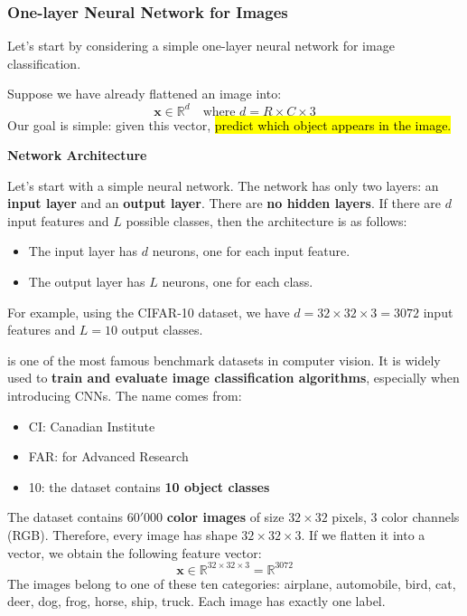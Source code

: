 \subsubsection{One-layer Neural Network for Images}\label{sec:one-layer-neural-network-for-images}

Let's start by considering a simple one-layer neural network for image classification.

\highspace
Suppose we have already flattened an image into:
\begin{equation*}
    \mathbf{x} \in \mathbb{R}^{d} \quad \text{where } d = R \times C \times 3
\end{equation*}
Our goal is simple: given this vector, \hl{predict which object appears in the image.}

\highspace
\begin{flushleft}
    \textcolor{Green3}{ \textbf{Network Architecture}}
\end{flushleft}
Let's start with a simple neural network. The network has only two layers: an \textbf{input layer} and an \textbf{output layer}. There are \textbf{no hidden layers}. If there are $d$ input features and $L$ possible classes, then the architecture is as follows:
\begin{itemize}
    \item The input layer has $d$ neurons, one for each input feature.
    \item The output layer has $L$ neurons, one for each class.
\end{itemize}
For example, using the CIFAR-10 dataset, we have $d = 32 \times 32 \times 3 = 3072$ input features and $L = 10$ output classes.

\highspace
\begin{deepeningbox}[: CIFAR-10]
     is one of the most famous benchmark datasets in computer vision. It is widely used to \textbf{train and evaluate image classification algorithms}, especially when introducing CNNs. The name comes from:
    \begin{itemize}
        \item CI: Canadian Institute
        \item FAR: for Advanced Research
        \item 10: the dataset contains \textbf{10 object classes}
    \end{itemize}
    The dataset contains $60'000$ \textbf{color images} of size $32 \times 32$ pixels, 3 color channels (RGB). Therefore, every image has shape $32 \times 32 \times 3$. If we flatten it into a vector, we obtain the following feature vector:
    \begin{equation*}
        \mathbf{x} \in \mathbb{R}^{32 \times 32 \times 3} = \mathbb{R}^{3072}
    \end{equation*}
    The images belong to one of these ten categories: airplane, automobile, bird, cat, deer, dog, frog, horse, ship, truck. Each image has exactly one label.
\end{deepeningbox}


